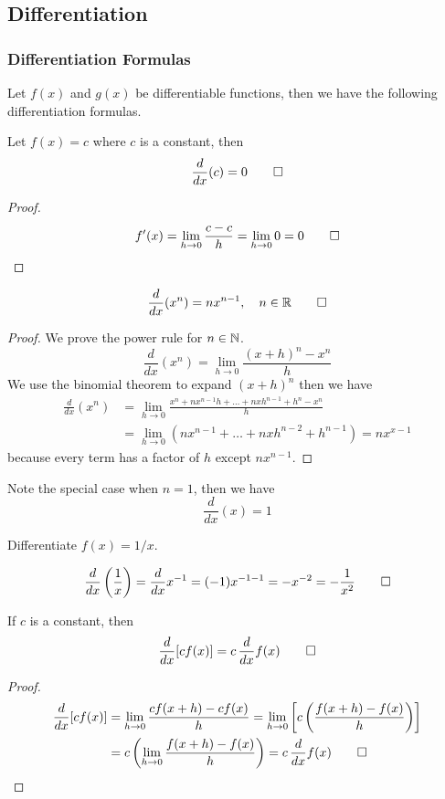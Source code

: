 \subsection{Differentiation}
\subsubsection{Differentiation Formulas}
Let \(f(x)\) and \(g(x)\) be differentiable functions, then we have the
following differentiation formulas.
\begin{theorem}
    Let \(f(x)=c\) where \(c\) is a constant, then
    \[\frac{d}{dx}(c)=0\qedhere\]
\end{theorem}
\begin{proof}
    \[f'(x)=\lim_{h\to 0}\frac{c-c}{h}=\lim_{h\to 0}0=0\qedhere\]
\end{proof}
\begin{theorem}
    \[\frac{d}{dx}(x^n)=nx^{n-1},\quad n\in\mathbb{R}\qedhere\]
\end{theorem}
\begin{proof}
    We prove the power rule for \(n\in\mathbb{N}\).
    \[\frac{d}{dx}(x^n)=\lim_{h\to 0}\frac{(x+h)^n-x^n}{h}\]
    We use the binomial theorem to expand \((x+h)^n\) then we have
    \begin{align*}
        \frac{d}{dx}(x^n)
        &= \lim_{h\to 0}\frac{x^n+nx^{n-1}h+\dots+nxh^{n-1}+h^n-x^n}{h} \\
        &= \lim_{h\to 0}(nx^{n-1}+\dots+nxh^{n-2}+h^{n-1})=nx^{x-1}
    \end{align*}
    because every term has a factor of \(h\) except \(nx^{n-1}\).
\end{proof}
Note the special case when \(n=1\), then we have \[\frac{d}{dx}(x)=1\]
\begin{problem}
    Differentiate \(f(x)=1/x\).
\end{problem}
\begin{solution}
    \[\frac{d}{dx}\left(\frac{1}{x}\right)=\frac{d}{dx}x^{-1}=(-1)x^{-1-1}
    =-x^{-2}=-\frac{1}{x^2}\qedhere\]
\end{solution}
\begin{theorem}
    If \(c\) is a constant, then
    \[\frac{d}{dx}[cf(x)]=c\,\frac{d}{dx}f(x)\qedhere\]
\end{theorem}
\begin{proof}
    \begin{align*}
        \frac{d}{dx}[cf(x)]&= \lim_{h\to 0}\frac{cf(x+h)-cf(x)}{h}
        =\lim_{h\to 0}\left[c\left(\frac{f(x+h)-f(x)}{h}\right)\right] \\
        &= c\left(\lim_{h\to 0}\frac{f(x+h)-f(x)}{h}\right)
        =c\,\frac{d}{dx}f(x)\qedhere
    \end{align*}
\end{proof}
